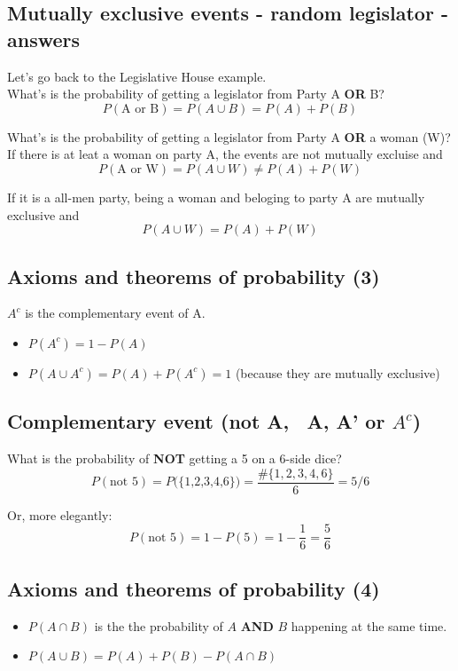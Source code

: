 \documentclass[11pt]{article}
\begin{document}
	\subsection*{Mutually exclusive events - random legislator - answers}
	
	Let's go back to the Legislative House example.\\
	
	What's is the probability of getting a legislator from Party A \textbf{OR} B?
	\[P(\text{A or B}) = P(A \cup B) = P(A) + P(B)\]
	
	What's is the probability of getting a legislator from Party A \textbf{OR} a woman (W)?\\
	
	If there is at leat a woman on party A, the events are not mutually excluise and \[P(\text{A or W}) = P(A \cup W) \neq P(A) + P(W)\]
	
	If it is a all-men party, being a woman and beloging to party A are mutually exclusive and
	\[P(A \cup W) = P(A) + P(W)\]


	\subsection*{Axioms and theorems of probability (3)}
	$A^c$ is the complementary event of A.
	\begin{itemize}
		\item  $P(A^c) = 1 - P(A)$
		\item  $P(A \cup A^c) = P(A) + P(A^c) = 1$ (because they are mutually exclusive)
	\end{itemize}


	\subsection*{Complementary event (not A, ~A, A' or $A^c$)}
	What is the probability of \textbf{NOT} getting a 5 on a 6-side dice?
	\[P(\text{not 5}) = P\text{(\{1,2,3,4,6\})} = \frac{\#\{1, 2, 3, 4, 6\}}{6} =  5/6	\]

	Or, more elegantly:
	\[P(\text{not 5}) = 1 - P(5) = 1 - \frac{1}{6} = \frac{5}{6}\]

	\subsection*{Axioms and theorems of probability (4)}
	\begin{itemize}
		\item $P(A \cap B)$ is the the probability of $A$ \textbf{AND} $B$ happening at the same time.																																																																																																																		
		\item  $P(A \cup B) = P(A) + P(B) - P(A \cap B)$ 
	\end{itemize}
\end{document}

